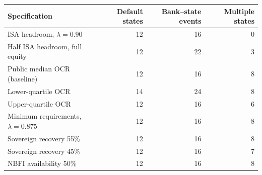 \begin{tabular*}{\textwidth}{@{\extracolsep{\fill}}lrrr@{}}
\toprule
Specification & Default states & Bank--state events & Multiple states \\
\midrule
ISA headroom, $\lambda=0.90$ & 12 & 16 & 0 \\
Half ISA headroom, full equity & 12 & 22 & 3 \\
Public median OCR (baseline) & 12 & 16 & 8 \\
Lower-quartile OCR & 14 & 24 & 8 \\
Upper-quartile OCR & 12 & 16 & 6 \\
Minimum requirements, $\lambda=0.875$ & 12 & 16 & 8 \\
Sovereign recovery 55\% & 12 & 16 & 8 \\
Sovereign recovery 45\% & 12 & 16 & 7 \\
NBFI availability 50\% & 12 & 16 & 8 \\
\bottomrule
\end{tabular*}
